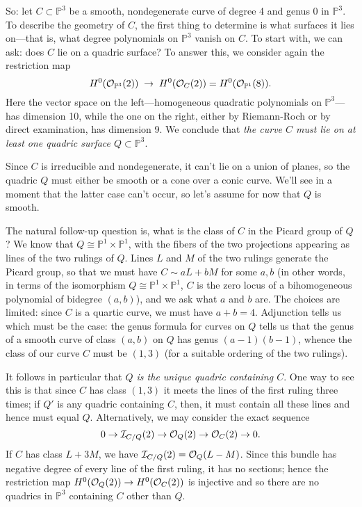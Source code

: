 \documentclass[12pt, leqno]{article}
\def\PP{{\mathbb P}}
\def\cO{{\cal O}}
\begin{document}
So: let $C \subset \PP^3$ be a smooth, nondegenerate curve of degree 4 and genus 0 in $\PP^3$. To describe the geometry of $C$, the first thing to determine is what surfaces it lies on---that is, what degree polynomials on $\PP^3$ vanish on $C$. To start with, we can ask: does $C$ lie on a quadric surface? To answer this, we consider again the restriction map
$$
H^0(\cO_{\PP^3}(2)) \; \to \; H^0(\cO_{C}(2)) = H^0(\cO_{\PP^1}(8)).
$$
Here the vector space on the left---homogeneous quadratic polynomials on $\PP^3$---has dimension 10, while the one on the right, either by Riemann-Roch or by direct examination, has dimension 9. We conclude that \emph{the curve $C$ must lie on at least one quadric surface $Q \subset \PP^3$}.

Since $C$ is irreducible and nondegenerate, it can't lie on a union of planes, so the quadric $Q$ must either be smooth or a cone over a conic curve. We'll see in a moment that the latter case can't occur, so let's assume for now that $Q$ is smooth. 

The natural follow-up question is, what is the class of $C$ in the Picard group of $Q$? We know that $Q \cong \PP^1 \times \PP^1$, with the fibers of the two projections appearing as lines of the two rulings of $Q$. Lines $L$ and $M$ of the two rulings generate the Picard group, so that we must have $C \sim aL + bM$ for some $a, b$ (in other words, in terms of the isomorphism $Q \cong \PP^1 \times \PP^1$, $C$ is the zero locus of a bihomogeneous polynomial of bidegree $(a,b)$), and we ask what $a$ and $b$ are. The choices are limited: since $C$ is a quartic curve, we must have $a+b = 4$. Adjunction tells us which must be the case: the genus formula for curves on $Q$ tells us that the genus of a smooth curve of class $(a,b)$ on $Q$ has genus $(a-1)(b-1)$, whence the class of our curve $C$ must be $(1,3)$ (for a suitable ordering of the two rulings).

It follows in particular that \emph{$Q$ is the unique quadric containing $C$}. One way to see this is that since $C$ has class $(1,3)$ it meets the lines of the first ruling three times; if $Q'$ is any quadric containing $C$, then, it must contain all these lines and hence must equal $Q$. Alternatively, we may consider the exact sequence
$$
0 \to \cI_{C/Q}(2) \to \cO_Q(2)  \to \cO_C(2) \to 0.
$$
If $C$ has class $L+3M$, we have $\cI_{C/Q}(2) = \cO_{Q}(L-M)$. Since this bundle has negative degree of every line of the first ruling, it has no sections; hence the restriction map $H^0(\cO_Q(2))  \to H^0(\cO_C(2))$ is injective and so there are no  quadrics in $\PP^3$ containing $C$ other than $Q$.
\end{document}

